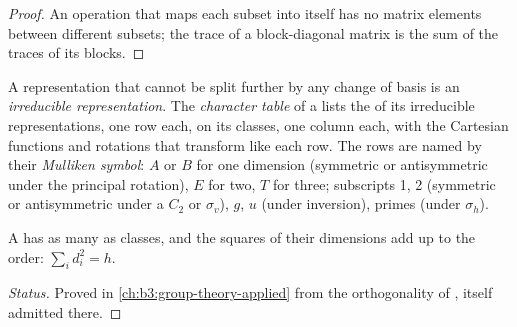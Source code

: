 \begin{proof}
An operation that maps each subset into itself has no matrix elements
between different subsets; the trace of a block-diagonal matrix is the sum
of the traces of its blocks.
\end{proof}

\begin{definition}\label{def:b3:point-groups:irrep}
A representation that cannot be split further by any change of basis is an
\emph{irreducible representation}. The
\emph{character table} of a  lists the
 of its irreducible representations, one row each, on its classes,
one column each, with the Cartesian functions and rotations that transform
like each row. The rows are named by their \emph{Mulliken
symbol}: $A$ or $B$ for one dimension (symmetric or
antisymmetric under the principal rotation), $E$ for two, $T$ for three;
subscripts 1, 2 (symmetric or antisymmetric under a $C_2$ or $\sigma_v$), $g$, $u$
(under inversion), primes (under $\sigma_h$).
\end{definition}

\begin{proposition}\label{prop:b3:point-groups:irrep-count}
A  has as many  as classes, and the
squares of their dimensions add up to the order: $\sum_id_i^2 = h$.
\end{proposition}
\begin{proof}[Status]
Proved in \cref{ch:b3:group-theory-applied} from the orthogonality of
, itself admitted there.
\end{proof}

